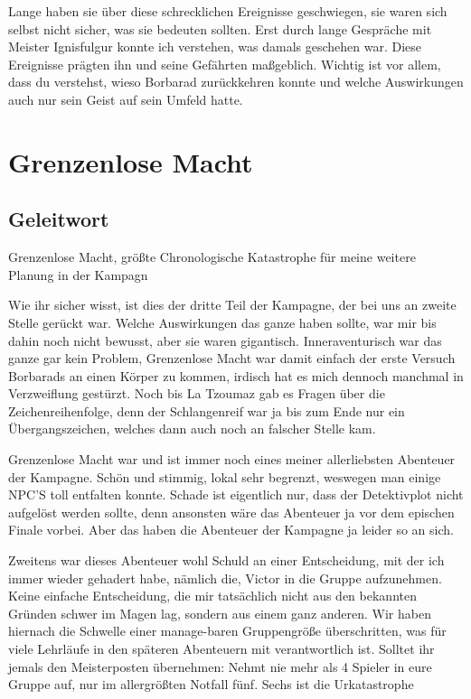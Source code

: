 Lange haben sie über diese schrecklichen Ereignisse geschwiegen, sie waren sich selbst nicht sicher, was sie bedeuten sollten. Erst durch lange Gespräche mit Meister Ignisfulgur konnte ich verstehen, was damals geschehen war. Diese Ereignisse prägten ihn und seine Gefährten maßgeblich. Wichtig ist vor allem, dass du verstehst, wieso Borbarad zurückkehren konnte und welche Auswirkungen auch nur sein Geist auf sein Umfeld hatte.




\chapter{Grenzenlose Macht}

\section{Geleitwort}
Grenzenlose Macht, größte Chronologische Katastrophe für meine weitere Planung in der Kampagn

Wie ihr sicher wisst, ist dies der dritte Teil der Kampagne, der bei uns an zweite Stelle gerückt war. Welche Auswirkungen das ganze haben sollte, war mir bis dahin noch nicht bewusst, aber sie waren gigantisch. Inneraventurisch war das ganze gar kein Problem, Grenzenlose Macht war damit einfach der erste Versuch Borbarads an einen Körper zu kommen, irdisch hat es mich dennoch manchmal in Verzweiflung gestürzt. Noch bis La Tzoumaz gab es Fragen über die Zeichenreihenfolge, denn der Schlangenreif war ja bis zum Ende nur ein Übergangszeichen, welches dann auch noch an falscher Stelle kam.

Grenzenlose Macht war und ist immer noch eines meiner allerliebsten Abenteuer der Kampagne. Schön und stimmig, lokal sehr begrenzt, weswegen man einige NPC'S toll entfalten konnte. Schade ist eigentlich nur, dass der Detektivplot  nicht aufgelöst werden sollte, denn ansonsten wäre das Abenteuer ja vor dem epischen Finale vorbei. Aber das haben die Abenteuer der Kampagne ja leider so an sich.

Zweitens war dieses Abenteuer wohl Schuld an einer Entscheidung, mit der ich immer wieder gehadert habe, nämlich die, Victor in die Gruppe aufzunehmen. Keine einfache Entscheidung, die mir tatsächlich nicht aus den bekannten Gründen schwer im Magen lag, sondern aus einem ganz anderen. Wir haben hiernach die Schwelle einer manage-baren Gruppengröße überschritten, was für viele Lehrläufe in den späteren Abenteuern mit verantwortlich ist. Solltet ihr jemals den Meisterposten übernehmen: Nehmt nie mehr als 4 Spieler in eure Gruppe auf, nur im allergrößten Notfall fünf. Sechs ist die Urkatastrophe


